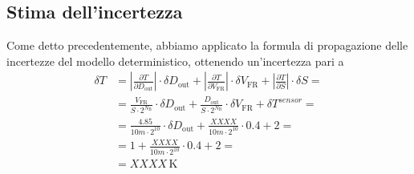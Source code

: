 \documentclass[a4paper]{article}
\newcommand\abs[1]{\left|#1\right|}
\begin{document}
		\subsection{Stima dell'incertezza}
			Come detto precedentemente, abbiamo applicato la formula di propagazione delle incertezze del modello deterministico, ottenendo un'incertezza pari a
			\begin{equation*}
				\begin{split}
					\delta T &= \abs{\frac{\partial T}{\partial D_{\mathrm{out}}}} \cdot \delta D_{\mathrm{out}} + \abs{\frac{\partial T}{\partial V_{\mathrm{FR}}}} \cdot \delta V_{\mathrm{FR}} + \abs{\frac{\partial T}{\partial S}} \cdot \delta S = \\
							 &= \frac{V_{\mathrm{FR}}}{S \cdot 2^{N_{\mathrm{B}}}} \cdot \delta D_{\mathrm{out}} + \frac{D_{\mathrm{out}}}{S \cdot 2^{N_{\mathrm{B}}}} \cdot \delta V_{\mathrm{FR}} + \delta T^{sensor} = \\
							 &= \frac{4.85}{10m \cdot 2^{10}} \cdot \delta D_{\mathrm{out}} + \frac{XXXX}{10m \cdot 2^{10}} \cdot 0.4 + 2 = \\
							 &= 1 + \frac{XXXX}{10m \cdot 2^{10}} \cdot 0.4 + 2 = \\
							 &= XXXX \, \mathrm{K}
				\end{split}
			\end{equation*}
\end{document}
